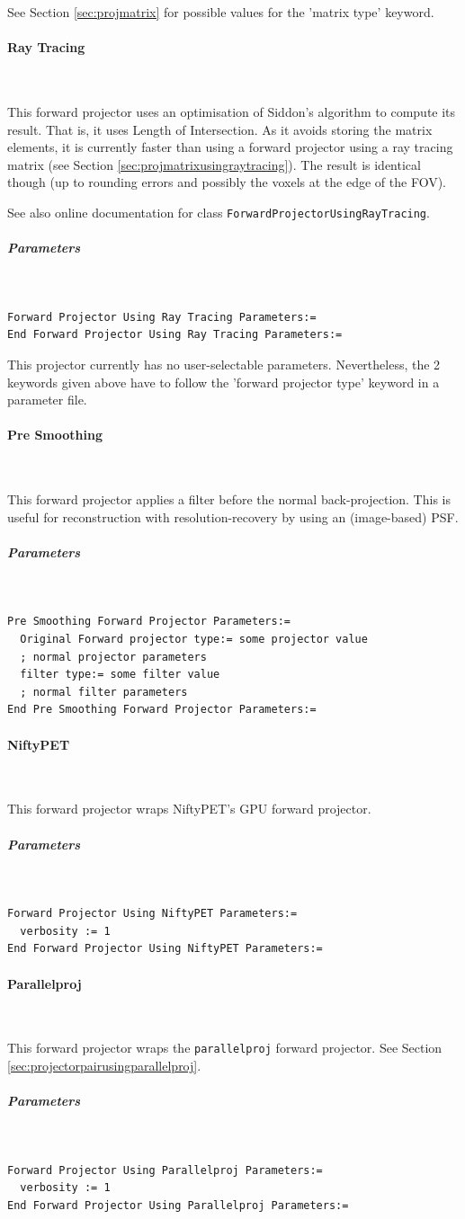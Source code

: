 \documentclass{article}
\newcommand{\subsubsubsection}[1]{\paragraph{#1}\mbox{} \\}
\newcommand{\subsubsubsubsection}[1]{\subparagraph{#1} \mbox{} \\}
\begin{document}
{{See Section \ref{sec:projmatrix} for possible values for the 'matrix type' keyword.

{ \subsubsubsection{Ray Tracing}
}
This forward projector uses an optimisation of Siddon's algorithm 
to compute its result. That is, it uses Length of Intersection. 
As it avoids storing the matrix elements, it is currently faster 
than using a forward projector using a ray tracing matrix (see 
Section \ref{sec:projmatrixusingraytracing}). The result is identical though (up to rounding 
errors and possibly the voxels at the edge of the FOV).


See also online documentation for class \texttt{ForwardProjectorUsingRayTracing}.

{ \subsubsubsubsection{Parameters}
}
\begin{verbatim}
Forward Projector Using Ray Tracing Parameters:=
End Forward Projector Using Ray Tracing Parameters:=
\end{verbatim}

This projector currently has no user-selectable parameters. Nevertheless, 
the 2 keywords given above have to follow the 'forward projector 
type' keyword in a parameter file.

{ \subsubsubsection{Pre Smoothing}
}
This forward projector applies a filter before the normal back-projection.
This is useful for reconstruction with resolution-recovery 
by using an (image-based) PSF.

{ \subsubsubsubsection{Parameters}
}
\begin{verbatim}
Pre Smoothing Forward Projector Parameters:=
  Original Forward projector type:= some projector value 
  ; normal projector parameters
  filter type:= some filter value
  ; normal filter parameters
End Pre Smoothing Forward Projector Parameters:=
\end{verbatim}

{ \subsubsubsection{NiftyPET}
}
This forward projector wraps NiftyPET's GPU forward projector.

{ \subsubsubsubsection{Parameters}
}
\begin{verbatim}
Forward Projector Using NiftyPET Parameters:=
  verbosity := 1
End Forward Projector Using NiftyPET Parameters:=
\end{verbatim}

{ \subsubsubsection{Parallelproj}
}
This forward projector wraps the \texttt{parallelproj} forward projector.
See Section \ref{sec:projectorpairusingparallelproj}.

{ \subsubsubsubsection{Parameters}
}
\begin{verbatim}
Forward Projector Using Parallelproj Parameters:=
  verbosity := 1
End Forward Projector Using Parallelproj Parameters:=
\end{verbatim}

}}
\end{document}
